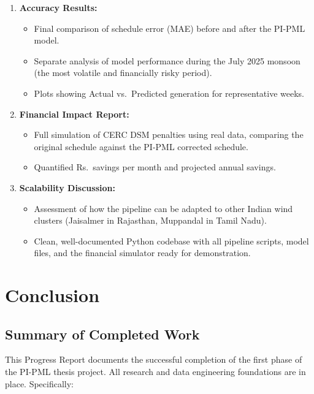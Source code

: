 \documentclass[12pt,a4paper]{report}
\begin{document}
\begin{enumerate}[leftmargin=*, label=\textbf{\Alph*.}]
    \item \textbf{Accuracy Results:}
    \begin{itemize}
        \item Final comparison of schedule error (MAE) before and after the PI-PML model.
        \item Separate analysis of model performance during the July 2025 monsoon (the most volatile and financially risky period).
        \item Plots showing Actual vs.\ Predicted generation for representative weeks.
    \end{itemize}

    \item \textbf{Financial Impact Report:}
    \begin{itemize}
        \item Full simulation of CERC DSM penalties using real data, comparing the original schedule against the PI-PML corrected schedule.
        \item Quantified Rs.\ savings per month and projected annual savings.
    \end{itemize}

    \item \textbf{Scalability Discussion:}
    \begin{itemize}
        \item Assessment of how the pipeline can be adapted to other Indian wind clusters (Jaisalmer in Rajasthan, Muppandal in Tamil Nadu).
        \item Clean, well-documented Python codebase with all pipeline scripts, model files, and the financial simulator ready for demonstration.
    \end{itemize}
\end{enumerate}

\chapter{Conclusion}

\section{Summary of Completed Work}

This Progress Report documents the successful completion of the first phase of the PI-PML thesis project. All research and data engineering foundations are in place. Specifically:
\end{document}
